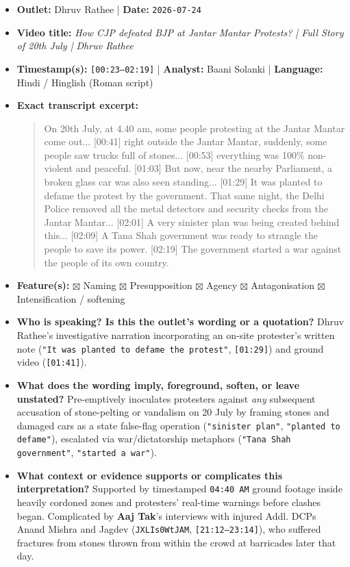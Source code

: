 \documentclass[10pt,a4paper]{article}
\begin{document}
\begin{itemize}[leftmargin=1.5em, itemsep=3pt, topsep=4pt]
  \item \textbf{Outlet:} Dhruv Rathee | \textbf{Date:} \texttt{2026-07-24}
  \item \textbf{Video title:} \textit{How CJP defeated BJP at Jantar Mantar Protests? | Full Story of 20th July | Dhruv Rathee}
  \item \textbf{Timestamp(s):} \texttt{[00:23--02:19]} | \textbf{Analyst:} Baani Solanki | \textbf{Language:} Hindi / Hinglish (Roman script)
  \item \textbf{Exact transcript excerpt:}
    \begin{quote}\small\ttfamily [00:23] On 20th July, at 4.40 am, some people protesting at the Jantar Mantar come out... [00:41] right outside the Jantar Mantar, suddenly, some people saw trucks full of stones... [00:53] everything was 100\% non-violent and peaceful. [01:03] But now, near the nearby Parliament, a broken glass car was also seen standing... [01:29] It was planted to defame the protest by the government. That same night, the Delhi Police removed all the metal detectors and security checks from the Jantar Mantar... [02:01] A very sinister plan was being created behind this... [02:09] A Tana Shah government was ready to strangle the people to save its power. [02:19] The government started a war against the people of its own country.\end{quote}
  \item \textbf{Feature(s):} $\boxtimes$ Naming $\boxtimes$ Presupposition $\boxtimes$ Agency $\boxtimes$ Antagonisation $\boxtimes$ Intensification / softening
  \item \textbf{Who is speaking? Is this the outlet's wording or a quotation?} Dhruv Rathee's investigative narration incorporating an on-site protester's written note (\texttt{"It was planted to defame the protest"}, \texttt{[01:29]}) and ground video (\texttt{[01:41]}).
  \item \textbf{What does the wording imply, foreground, soften, or leave unstated?} Pre-emptively inoculates protesters against \textit{any} subsequent accusation of stone-pelting or vandalism on 20 July by framing stones and damaged cars as a state false-flag operation (\texttt{"sinister plan"}, \texttt{"planted to defame"}), escalated via war/dictatorship metaphors (\texttt{"Tana Shah government"}, \texttt{"started a war"}).
  \item \textbf{What context or evidence supports or complicates this interpretation?} Supported by timestamped \texttt{04:40 AM} ground footage inside heavily cordoned zones and protesters' real-time warnings before clashes began. Complicated by \textbf{Aaj Tak}'s interviews with injured Addl. DCPs Anand Mishra and Jagdev (\texttt{JXLIs0WtJAM}, \texttt{[21:12--23:14]}), who suffered fractures from stones thrown from within the crowd at barricades later that day.

\end{itemize}
\end{document}
